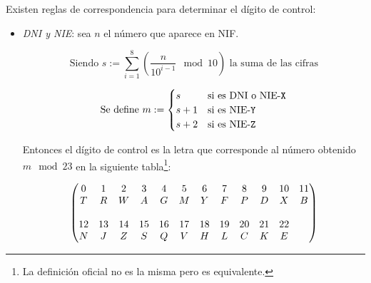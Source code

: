 \documentclass[11pt, a4paper, twoside]{report}
\begin{document}
					Existen reglas de correspondencia para determinar el dígito de control:
				\begin{itemize}
					\item {\itshape DNI y NIE}: sea $n$ el número que aparece en NIF.

						\begin{equation*}
							\text{Siendo } s := \sum_{i=1}^8 \left( \frac{n}{10^{i-1}} \mod 10 \right) \text{ la suma de las cifras}
						\end{equation*}

						\begin{equation*}
							\text{Se define } m := 
							\begin{cases}
								s & \text{si es DNI o NIE-{\texttt X}}\\
								s + 1 & \text{si es NIE-{\texttt Y}}\\
								s + 2 & \text{si es NIE-{\texttt Z}}\\
							\end{cases}
						\end{equation*}

						Entonces el dígito de control es la letra que corresponde al número obtenido $m \mod 23$ en la siguiente tabla\footnote{La definición oficial no es la misma pero es equivalente.}: 

						{\small
						\begin{equation*}
							\setcounter{MaxMatrixCols}{12}
							\begin{pmatrix}
								0 & 1 & 2 & 3 & 4 & 5 & 6 & 7 & 8 & 9 & 10 & 11\\
								T & R & W & A & G & M & Y & F & P & D & X  & B  \\
								\\
								12 & 13 & 14 & 15 & 16 & 17 & 18 & 19 & 20 & 21 & 22 &\\
								N  & J  & Z  & S  & Q  & V  & H  & L  & C  & K  & E &\\ 
							\end{pmatrix}
						\end{equation*}
						}


\end{itemize}
\end{document}
